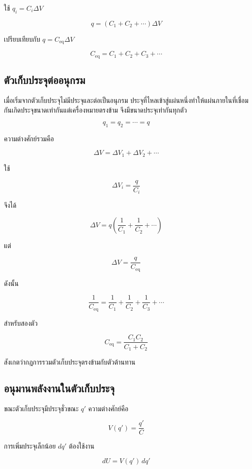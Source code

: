 ใช้ $q_i=C_i\Delta V$

\[
q=(C_1+C_2+\cdots)\Delta V
\]

เปรียบเทียบกับ $q=C_{\text{eq}}\Delta V$

\begin{tcolorbox}[title={ตัวเก็บประจุต่อขนาน}]
\[
\boxed{C_{\text{eq}}=C_1+C_2+C_3+\cdots}
\]
\end{tcolorbox}

\subsection{ตัวเก็บประจุต่ออนุกรม}

เมื่อเริ่มจากตัวเก็บประจุไม่มีประจุและต่อเป็นอนุกรม ประจุที่ไหลเข้าสู่แผ่นหนึ่งทำให้แผ่นภายในที่เชื่อมกันเกิดประจุขนาดเท่ากันแต่เครื่องหมายตรงข้าม จึงมีขนาดประจุเท่ากันทุกตัว

\[
q_1=q_2=\cdots=q
\]

ความต่างศักย์รวมคือ

\[
\Delta V=\Delta V_1+\Delta V_2+\cdots
\]

ใช้

\[
\Delta V_i=\frac{q}{C_i}
\]

จึงได้

\[
\Delta V=q\left(\frac{1}{C_1}+\frac{1}{C_2}+\cdots\right)
\]

แต่

\[
\Delta V=\frac{q}{C_{\text{eq}}}
\]

ดังนั้น

\begin{tcolorbox}[title={ตัวเก็บประจุต่ออนุกรม}]
\[
\boxed{\frac{1}{C_{\text{eq}}}
=\frac{1}{C_1}+\frac{1}{C_2}+\frac{1}{C_3}+\cdots}
\]
\end{tcolorbox}

สำหรับสองตัว

\[
\boxed{C_{\text{eq}}=\frac{C_1C_2}{C_1+C_2}}
\]

สังเกตว่ากฎการรวมตัวเก็บประจุตรงข้ามกับตัวต้านทาน

\subsection{อนุมานพลังงานในตัวเก็บประจุ}

ขณะตัวเก็บประจุมีประจุชั่วขณะ $q'$ ความต่างศักย์คือ

\[
V(q')=\frac{q'}{C}
\]

การเพิ่มประจุเล็กน้อย $dq'$ ต้องใช้งาน

\[
dU=V(q')\,dq'
\]

